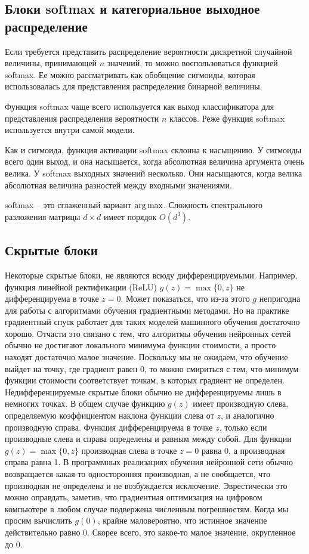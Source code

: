 \documentclass[%
	11pt,
	a4paper,
	utf8,
]{article}
\begin{document}
\subsection{Блоки softmax и категориальное выходное распределение}

Если требуется представить распределение вероятности дискретной случайной величины, принимающей $ n $ значений, то можно воспользоваться функцией softmax. Ее можно рассматривать как обобщение сигмоиды, которая использовалась для представления распределения бинарной величины.

Функция softmax чаще всего используется как выход классификатора для представления распределения вероятности $ n $ классов. Реже функция softmax используется внутри самой модели.

Как и сигмоида, функция активации softmax склонна к насыщению. У сигмоиды всего один выход, и она насыщается, когда абсолютная величина аргумента очень велика. У softmax выходных значений несколько. Они насыщаются, когда велика абсолютная величина разностей между входными значениями.

softmax -- это сглаженный вариант $ \operatorname*{arg\,max} $. Сложность спектрального разложения матрицы $ d \times d $ имеет порядок $ O(d^3) $.

\subsection{Скрытые блоки}

Некоторые скрытые блоки, не являются всюду дифференцируемыми. Например, функция линейной ректификации (ReLU) $ g(z) = \max \{ 0, z \} $ не дифференцируема в точке $ z = 0 $. Может показаться, что из-за этого $ g $ непригодна для работы с алгоритмами обучения градиентными методами. Но на практике градиентный спуск работает для таких моделей машинного обучения достаточно хорошо. Отчасти это связано с тем, что {\color{blue}алгоритмы обучения нейронных сетей обычно не достигают локального минимума функции стоимости}, а просто находят достаточно малое значение. {\color{blue}Поскольку мы не ожидаем, что обучение выйдет на точку, где градиент равен 0, то можно смириться с тем, что минимум функции стоимости соответствует точкам, в которых градиент не определен.} Недифференцируемые скрытые блоки обычно не дифференцируемы лишь в немногих точках. В общем случае функцию $ g(z) $ имеет производную слева, определяемую коэффициентом наклона функции слева от $ z $, и аналогично производную справа. Функция дифференцируема в точке $ z $, только если производные слева и справа определены и равным между собой. Для функции $ g(z) = \max \{ 0, z \} $ производная слева в точке $ z = 0 $ равна 0, а производная справа равна 1. В программных реализациях обучения нейронной сети обычно возвращается какая-то односторонняя производная, а не сообщается, что производная не определена и не возбуждается исключение. Эврестически это можно оправдать, заметив, что градиентная оптимизация на цифровом компьютере в любом случае подвержена численным погрешностям. Когда мы просим вычислить $ g(0) $, крайне маловероятно, что истинное значение действительно равно 0. Скорее всего, это какое-то малое значение, округленное до 0.
\end{document}
